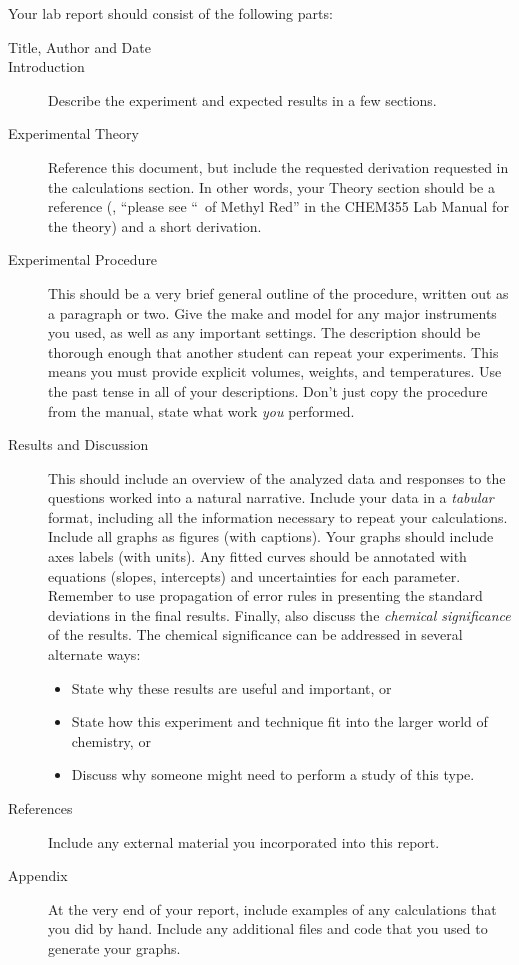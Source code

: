 Your lab report should consist of the following parts:
\begin{description}
	\item[Title, Author and Date]
	\item[Introduction] Describe the experiment and expected results in a few sections. 
	\item[Experimental Theory] Reference this document, but include the requested derivation requested in the calculations section. In other words, your Theory section should be a reference (\eg, ``please see ``\pKa\ of Methyl Red'' in the CHEM355 Lab Manual for the theory) and a short derivation.
	\item[Experimental Procedure] This should be a very brief general outline of the procedure, written out as a paragraph or two. Give the make and model for any major instruments you used, as well as any important settings. The description should be thorough enough that another student can repeat your experiments. This means you must provide explicit volumes, weights, and temperatures. Use the past tense in all of your descriptions. Don't just copy the procedure from the manual, state what work \emph{you} performed. 
	\item[Results and Discussion] This should include an overview of the analyzed data and responses to the questions worked into a natural narrative. 
	Include your data in a \emph{tabular} format, including all the information necessary to repeat your calculations. 
	Include all graphs as figures (with captions). 
	Your graphs should include axes labels (with units). 
	Any fitted curves should be annotated with equations (slopes, intercepts) and uncertainties for each parameter. 
	Remember to use propagation of error rules in presenting the standard deviations in the final results. 
	Finally, also discuss the \emph{chemical significance} of the results. 
	The chemical significance can be addressed in several alternate ways:
	\begin{itemize}
		\item State why these results are useful and important, or
		\item State how this experiment and technique fit into the larger world of chemistry, or
		\item Discuss why someone might need to perform a study of this type.
	\end{itemize}
	\item[References] Include any external material you incorporated into this report. 
	\item[Appendix] At the very end of your report, include examples of any calculations that you did by hand. 
	Include any additional files and code that you used to generate your graphs.
\end{description}
